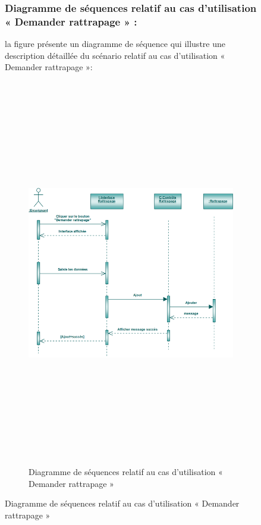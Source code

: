 \documentclass[12 pt]{report}
\begin{document}
\begin{figure}[h]
\begin{center}
\subsubsection{Diagramme de séquences relatif au cas d’utilisation « Demander rattrapage » :}
la figure   présente un diagramme de séquence qui illustre une description détaillée du scénario relatif au cas d’utilisation « Demander rattrapage »: 
{\begin{figure}[h]
 \begin{center}
\includegraphics[width= 18 cm ,height=  17cm]{sdr.PNG}
\caption{Diagramme de séquences relatif au cas d’utilisation « Demander rattrapage  »}

\end{center}
\end{figure}}
\newpage

\end{center}
\end{figure}
\end{document}

